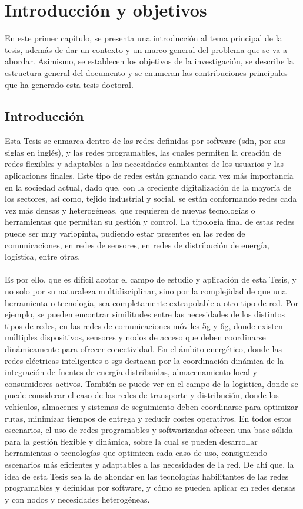 \chapter{Introducción y objetivos}

En este primer capítulo, se presenta una introducción al tema principal de la tesis, además de dar un contexto y un marco general del problema que se va a abordar. Asimismo, se establecen los objetivos de la investigación, se describe la estructura general del documento y se enumeran las contribuciones principales que ha generado esta tesis doctoral.

\section{Introducción}

Esta Tesis se enmarca dentro de las redes definidas por software (\gls{sdn}, por sus siglas en inglés), y las redes programables, las cuales permiten la creación de redes flexibles y adaptables a las necesidades cambiantes de los usuarios y las aplicaciones finales. Este tipo de redes están ganando cada vez más importancia en la sociedad actual, dado que, con la creciente digitalización de la mayoría de los sectores, así como, tejido industrial y social, se están conformando redes cada vez más densas y heterogéneas, que requieren de nuevas tecnologías o herramientas que permitan su gestión y control. La tipología final de estas redes puede ser muy variopinta, pudiendo estar presentes en las redes de comunicaciones, en redes de sensores, en redes de distribución de energía, logística, entre otras.\\
\\
Es por ello, que es difícil acotar el campo de estudio y aplicación de esta Tesis, y no solo por su naturaleza multidisciplinar, sino por la complejidad de que una herramienta o tecnología, sea completamente extrapolable a otro tipo de red. Por ejemplo, se pueden encontrar similitudes entre las necesidades de los distintos tipos de redes, en las redes de comunicaciones móviles \gls{5g} y \gls{6g}, donde existen múltiples dispositivos, sensores y nodos de acceso que deben coordinarse dinámicamente para ofrecer conectividad. En el ámbito energético, donde las redes eléctricas inteligentes o \glspl{sg} destacan por la coordinación dinámica de la integración de fuentes de energía distribuidas, almacenamiento local y consumidores activos. También se puede ver en el campo de la logística, donde se puede considerar el caso de las redes de transporte y distribución, donde los vehículos, almacenes y sistemas de seguimiento deben coordinarse para optimizar rutas, minimizar tiempos de entrega y reducir costes operativos. En todos estos escenarios, el uso de redes programables y softwarizadas ofrecen una base sólida para la gestión flexible y dinámica, sobre la cual se pueden desarrollar herramientas o tecnologías que optimicen cada caso de uso, consiguiendo escenarios más eficientes y adaptables a las necesidades de la red. De ahí que, la idea de esta Tesis sea la de ahondar en las tecnologías habilitantes de las redes programables y definidas por software, y cómo se pueden aplicar en redes densas y con nodos y necesidades heterogéneas. 

